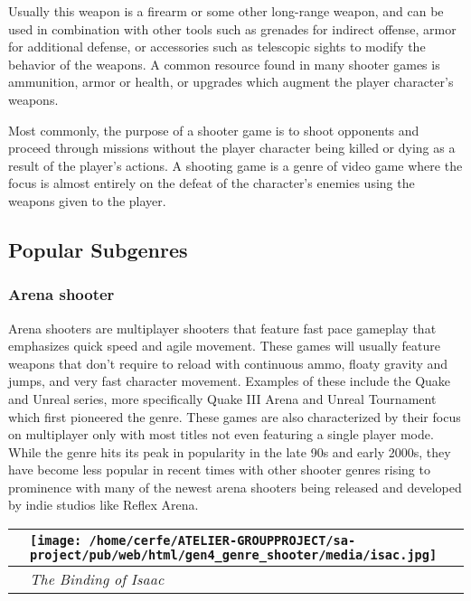 \documentclass[a4paper,10pt]{book}
\begin{document}
 
            Usually this weapon is a firearm or some other long-range weapon, and can be used in combination with other tools such as grenades for indirect offense, armor for additional defense, or accessories such as telescopic sights to modify the behavior of the weapons. 
            A common resource found in many shooter games is ammunition, armor or health, or upgrades which augment the player character's weapons.
         
 Most commonly, the purpose of a shooter game is to shoot opponents and proceed through missions without the player character being killed or dying as a result of the player's actions. 
            A shooting game is a genre of video game where the focus is almost entirely on the defeat of the character's enemies using the weapons given to the player.
         
 \subsection{Popular Subgenres }
 \subsubsection{Arena shooter }
 
            Arena shooters are multiplayer shooters that feature fast pace gameplay that emphasizes quick speed and agile movement. 
            These games will usually feature weapons that don't require to reload with continuous ammo, floaty gravity and jumps, and very fast character movement. 
            Examples of these include the Quake and Unreal series, more specifically Quake III Arena and Unreal Tournament which first pioneered the genre. 
            These games are also characterized by their focus on multiplayer only with most titles not even featuring a single player mode. 
            While the genre hits its peak in popularity in the late 90s and early 2000s, they have become less popular in recent times with other shooter genres rising to prominence with many of the newest arena shooters being released and developed by indie studios like Reflex Arena. 
         
 \begin{longtable}{p{1mm}|l|}\hline
 
 & \texttt{[image: /home/cerfe/ATELIER-GROUPPROJECT/sa-project/pub/web/html/gen4\_genre\_shooter/media/isac.jpg]}
 \\\hline
 
 & \textit{The Binding of Isaac }
 \\\hline
 \end{longtable}
 
\end{document}
